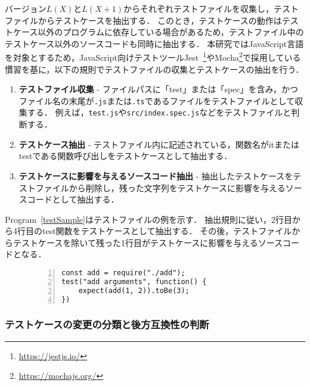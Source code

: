 \documentclass[submit]{ipsj}
\begin{document}
バージョン$L(X)$と$L(X+1)$からそれぞれテストファイルを収集し，テストファイルからテストケースを抽出する．
このとき，テストケースの動作はテストケース以外のプログラムに依存している場合があるため，テストファイル中のテストケース以外のソースコードも同時に抽出する．
本研究ではJavaScript言語を対象とするため，JavaScript向けテストツールJest~\footnote{\url{https://jestjs.io/}}やMocha\footnote{\url{https://mochajs.org/}}で採用している慣習を基に，以下の規則でテストファイルの収集とテストケースの抽出を行う．

\begin{enumerate}
  \item \textbf{テストファイル収集} - ファイルパスに「test」または「spec」を含み，かつファイル名の末尾が{\verb|.js|}または{\verb|.ts|}であるファイルをテストファイルとして収集する．
  例えば，{\verb|test.js|}や{\verb|src/index.spec.js|}などをテストファイルと判断する．
  \item \textbf{テストケース抽出} - テストファイル内に記述されている，関数名がitまたはtestである関数呼び出しをテストケースとして抽出する．
  \item \textbf{テストケースに影響を与えるソースコード抽出} - 抽出したテストケースをテストファイルから削除し，残った文字列をテストケースに影響を与えるソースコードとして抽出する．
\end{enumerate}

Program~\ref{testSample}はテストファイルの例を示す．
抽出規則に従い，2行目から4行目のtest関数をテストケースとして抽出する．
その後，テストファイルからテストケースを除いて残った1行目がテストケースに影響を与えるソースコードとなる．

\begin{figure}[h]
    \begin{lstlisting}[caption={[upper/lower text]%
               \begin{tabular}[t]{@{}l@{}}
                test/sample.js \\[1.0\normalbaselineskip]
               \end{tabular}},frame={tb},numbers=left,label=testSample,identifierstyle={\small},xleftmargin=6mm]
const add = require("./add");
test("add arguments", function() {
    expect(add(1, 2)).toBe(3);
})
\end{lstlisting}
\end{figure}

\subsubsection{テストケースの変更の分類と後方互換性の判断}
\label{sec:step1-2}
\end{document}
